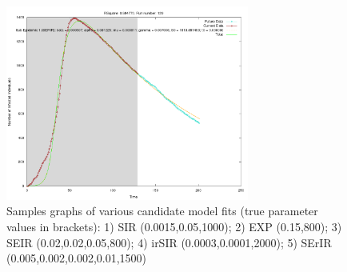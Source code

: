 \begin{centering}
\begin{figure}[h!]
  \includegraphics[width=8cm]{images/single/serir1.png}
\caption{Samples graphs of various candidate model fits (true
  parameter values in brackets): 1) SIR
  (0.0015,0.05,1000); 2) EXP (0.15,800); 3) SEIR (0.02,0.02,0.05,800);
  4) irSIR (0.0003,0.0001,2000); 5) SErIR (0.005,0.002,0.002,0.01,1500)}
\label{fig:single1}
  \end{figure}
\end{centering}


